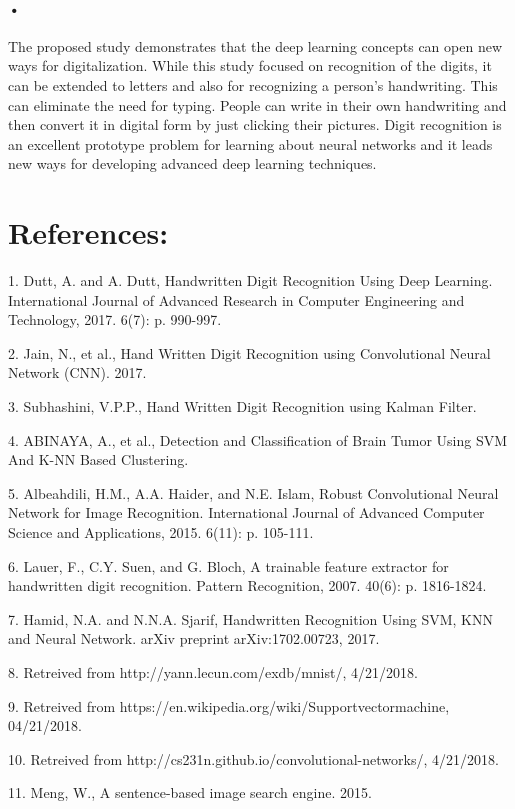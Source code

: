 \documentclass{article}
\begin{document}
\paragraph{•}
The proposed study demonstrates that the deep learning concepts can open new ways for digitalization. While this study focused on recognition of the digits,  it can be extended to letters and also for recognizing a person’s handwriting. This can eliminate the need for typing. People can write  in their own handwriting and then convert it in digital form by just clicking their pictures. Digit recognition is an excellent prototype problem for learning about neural networks and it leads new ways for developing advanced deep learning techniques.

\section{References:}


1. Dutt, A. and A. Dutt, Handwritten Digit Recognition Using Deep Learning. International Journal of Advanced Research in Computer Engineering and Technology, 2017. 6(7): p. 990-997.

2.	Jain, N., et al., Hand Written Digit Recognition using Convolutional Neural Network (CNN). 2017.

3.	Subhashini, V.P.P., Hand Written Digit Recognition using Kalman Filter.

4.	ABINAYA, A., et al., Detection and Classification of Brain Tumor Using SVM And K-NN Based Clustering.

5.	Albeahdili, H.M., A.A. Haider, and N.E. Islam, Robust Convolutional Neural Network for Image Recognition. International Journal of Advanced Computer Science and Applications, 2015. 6(11): p. 105-111.

6.	Lauer, F., C.Y. Suen, and G. Bloch, A trainable feature extractor for handwritten digit recognition. Pattern Recognition, 2007. 40(6): p. 1816-1824.

7.	Hamid, N.A. and N.N.A. Sjarif, Handwritten Recognition Using SVM, KNN and Neural Network. arXiv preprint arXiv:1702.00723, 2017.

8.	Retreived from http://yann.lecun.com/exdb/mnist/, 4/21/2018.

9.	Retreived from https://en.wikipedia.org/wiki/Supportvectormachine, 04/21/2018.

10.	Retreived from http://cs231n.github.io/convolutional-networks/,  4/21/2018.

11.	Meng, W., A sentence-based image search engine. 2015.
\end{document}
